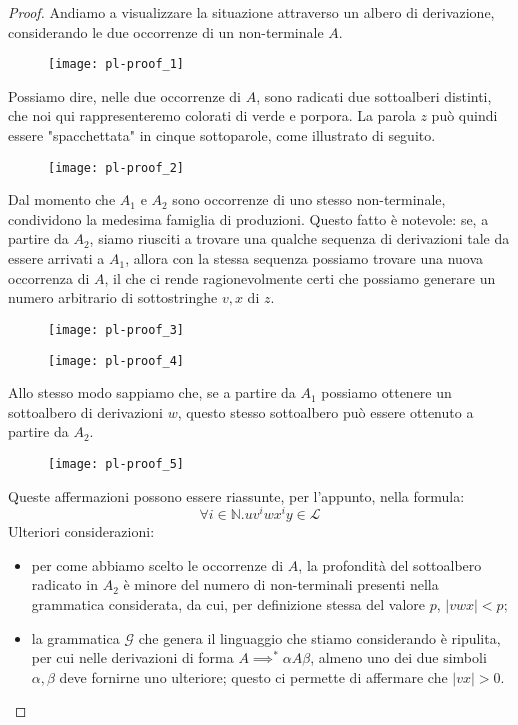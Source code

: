 \documentclass[class=book, crop=false, oneside, 12pt]{standalone}
\begin{document}
\begin{proof}
  Andiamo a visualizzare la situazione attraverso un albero di derivazione, considerando le due occorrenze di un non-terminale \(A\).
  \begin{figure}
    \centering
    \texttt{[image: pl-proof\_1]}
  \end{figure}
  Possiamo dire, nelle due occorrenze di \(A\), sono radicati due sottoalberi distinti, che noi qui rappresenteremo colorati di verde e porpora. La parola \(z\) può quindi essere "spacchettata" in cinque sottoparole, come illustrato di seguito.
  \begin{figure}
    \centering
    \texttt{[image: pl-proof\_2]}
  \end{figure}
  Dal momento che \(A_1\) e \(A_2\) sono occorrenze di uno stesso non-terminale, condividono la medesima famiglia di produzioni. Questo fatto è notevole: se, a partire da \(A_2\), siamo riusciti a trovare una qualche sequenza di derivazioni tale da essere arrivati a \(A_1\), allora con la stessa sequenza possiamo trovare una nuova occorrenza di \(A\), il che ci rende ragionevolmente certi che possiamo generare un numero arbitrario di sottostringhe \(v, x\) di \(z\).
  \begin{figure}[H]
    \centering
    \begin{minipage}{0.25\textwidth}
      \centering
      \texttt{[image: pl-proof\_3]}
    \end{minipage}
     \hfill
    \begin{minipage}{0.25\textwidth}
      \centering
      \texttt{[image: pl-proof\_4]}
    \end{minipage}
  \end{figure}
  Allo stesso modo sappiamo che, se a partire da \(A_1\) possiamo ottenere un sottoalbero di derivazioni \(w\), questo stesso sottoalbero può essere ottenuto a partire da \(A_2\).
  \begin{figure}
    \centering
    \texttt{[image: pl-proof\_5]}
  \end{figure}
  Queste affermazioni possono essere riassunte, per l'appunto, nella formula:
  \begin{equation*}
    \forall i \in \mathbb{N}.uv^iwx^iy \in \mathcal{L}
  \end{equation*}
  Ulteriori considerazioni:
   \begin{itemize}
     \item per come abbiamo scelto le occorrenze di \(A\), la profondità del sottoalbero radicato in \(A_2\) è minore del numero di non-terminali presenti nella grammatica considerata, da cui, per definizione stessa del valore \(p\), \(|vwx| < p\);
     \item la grammatica \(\mathcal{G}\) che genera il linguaggio che stiamo considerando è ripulita, per cui nelle derivazioni di forma \(A \implies^* \alpha A \beta\), almeno uno dei due simboli \(\alpha, \beta\) deve fornirne uno ulteriore; questo ci permette di affermare che \(|vx| > 0\).
   \end{itemize}


\end{proof}
\end{document}
